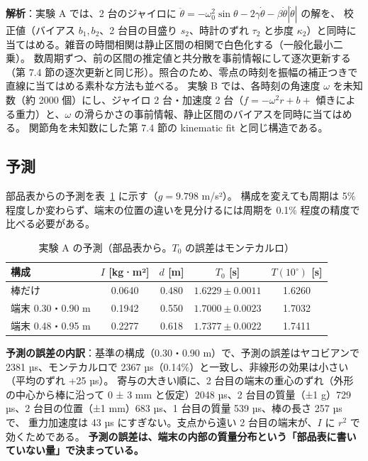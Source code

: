 \documentclass[paper=a4paper,fontsize=10pt,twocolumn,column_gap=2zw,line_length=24zw,number_of_lines=46,head_space=20mm]{jlreq}
\begin{document}
\textbf{解析}：実験 A では、2 台のジャイロに $\ddot\theta = -\omega_0^2\sin\theta - 2\gamma\dot\theta - \beta\dot\theta|\dot\theta|$ の解を、
校正値（バイアス $b_1, b_2$、2 台目の目盛り $s_2$、時計のずれ $\tau_2$ と歩度 $\kappa_2$）と同時に当てはめる。雑音の時間相関は静止区間の相関で白色化する（一般化最小二乗）。
数周期ずつ、前の区間の推定値と共分散を事前情報にして逐次更新する（第 7.4 節の逐次更新と同じ形）。照合のため、零点の時刻を振幅の補正つきで直線に当てはめる素朴な方法も並べる。
実験 B では、各時刻の角速度 $\omega$ を未知数（約 2000 個）にし、ジャイロ 2 台・加速度 2 台（$f=-\omega^2 r + b + $ 傾きによる重力）と、$\omega$ の滑らかさの事前情報、静止区間のバイアスを同時に当てはめる。
関節角を未知数にした第 7.4 節の kinematic fit と同じ構造である。

\subsection{予測}

部品表からの予測を表~\ref{tab:bgpred} に示す（$g=9.798$ m/s²）。
構成を変えても周期は 5\% 程度しか変わらず、端末の位置の違いを見分けるには周期を 0.1\% 程度の精度で比べる必要がある。

\begin{table}[t]\centering\footnotesize
\caption{実験 A の予測（部品表から。$T_0$ の誤差はモンテカルロ）}\label{tab:bgpred}
\setlength{\tabcolsep}{2.5pt}
\begin{tabular}{lcccc}\toprule
構成 & $I$ [kg·m²] & $d$ [m] & $T_0$ [s] & $T(10^\circ)$ [s] \\\midrule
棒だけ & 0.0640 & 0.480 & $1.6229\pm0.0011$ & 1.6260 \\
端末 0.30・0.90 m & 0.1942 & 0.550 & $1.7000\pm0.0023$ & 1.7032 \\
端末 0.48・0.95 m & 0.2277 & 0.618 & $1.7377\pm0.0022$ & 1.7411 \\\bottomrule
\end{tabular}
\end{table}

\textbf{予測の誤差の内訳}：基準の構成（0.30・0.90 m）で、予測の誤差はヤコビアンで 2381 µs、モンテカルロで 2367 µs（0.14\%）と一致し、非線形の効果は小さい（平均のずれ +25 µs）。
寄与の大きい順に、2 台目の端末の重心のずれ（外形の中心から棒に沿って 0 ± 3 mm と仮定）2048 µs、2 台目の質量（±1 g）729 µs、2 台目の位置（±1 mm）683 µs、1 台目の質量 539 µs、棒の長さ 257 µs で、
重力加速度は 43 µs にすぎない。支点から遠い 2 台目の端末が、$I$ に $r^2$ で効くためである。
\textbf{予測の誤差は、端末の内部の質量分布という「部品表に書いていない量」で決まっている。}
\end{document}
